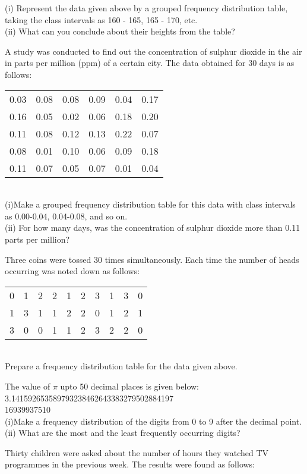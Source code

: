(i) Represent the data given above by a grouped frequency distribution table, taking the class intervals as 160 - 165, 165 - 170, etc.\\
(ii) What can you conclude about their heights from the table?\\
\item A study was conducted to find out the concentration of sulphur dioxide in the air in parts per million (ppm) of a certain city. The data obtained for 30 days is as follows:\\
\begin{tabular}{ |c|c|c|c|c|c| } 
 0.03 &0.08 &0.08 &0.09 &0.04 &0.17 \\ 
 0.16 &0.05 &0.02 &0.06 &0.18 &0.20 \\ 
 0.11 &0.08 &0.12 &0.13 &0.22 &0.07 \\ 
 0.08 &0.01 &0.10 &0.06 &0.09 &0.18 \\ 
 0.11 &0.07 &0.05 &0.07 &0.01 &0.04 \\ 
\end{tabular}\\
(i)Make a grouped frequency distribution table for this data with class intervals as 0.00-0.04, 0.04-0.08, and so on.\\
(ii) For how many days, was the concentration of sulphur dioxide more than 0.11 parts per million?\\
\item Three coins were tossed 30 times simultaneously. Each time the number of heads occurring was noted down as follows:\\
\begin{tabular}{ cccccccccc } 
 0 &1 &2 &2 &1 &2 &3 &1 &3 &0  \\ 
 1 &3 &1 &1 &2 &2 &0 &1 &2 &1\\ 
 3 &0 &0 &1 &1 &2 &3 &2 &2 &0\\ 
\end{tabular}\\
Prepare a frequency distribution table for the data given above.\\
\item The value of $\pi$ upto 50 decimal places is given below:
3.141592653589793238462643383279502884197\\
16939937510\\
(i)Make a frequency distribution of the digits from 0 to 9 after the decimal point.\\
(ii) What are the most and the least frequently occurring digits?\\
\item Thirty children were asked about the number of hours they watched TV programmes in the previous week. The results were found as follows:\\
